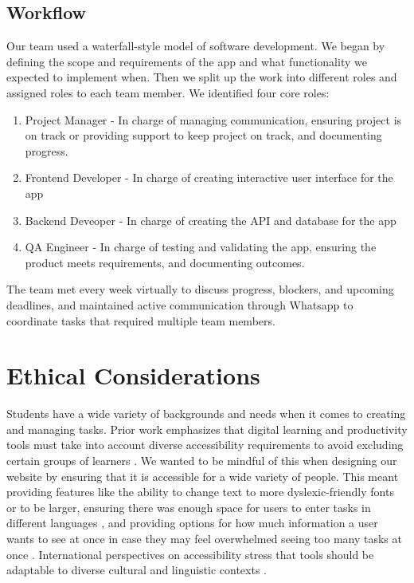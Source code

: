 \documentclass[11pt,oneside]{article}
\begin{document}
\subsection{Workflow}
Our team used a waterfall-style model of software development. We began by defining the scope and requirements of the app and what functionality we expected to implement when. Then we split up the work into different roles and assigned roles to each team member. We identified four core roles:

\begin{enumerate}
\item Project Manager - In charge of managing communication, ensuring project is on track or providing support to keep project on track, and documenting progress.
\item Frontend Developer - In charge of creating interactive user interface for the app
\item Backend Deveoper - In charge of creating the API and database for the app
\item QA Engineer - In charge of testing and validating the app, ensuring the product meets requirements, and documenting outcomes.
\end{enumerate}


The team met every week virtually to discuss progress, blockers, and upcoming deadlines, and maintained active communication through Whatsapp to coordinate tasks that required multiple team members.

\section{Ethical Considerations}
Students have a wide variety of backgrounds and needs when it comes to creating and managing tasks. Prior work emphasizes that digital learning and productivity tools must take into account diverse accessibility requirements to avoid excluding certain groups of learners \citep{seale2013learning}. We wanted to be mindful of this when designing our website by ensuring that it is accessible for a wide variety of people. This meant providing features like the ability to change text to more dyslexic-friendly fonts or to be larger, ensuring there was enough space for users to enter tasks in different languages \citep{al2016universal}, and providing options for how much information a user wants to see at once in case they may feel overwhelmed seeing too many tasks at once \citep{spina2019wcag}. International perspectives on accessibility stress that tools should be adaptable to diverse cultural and linguistic contexts \citep{world2011world}.
\end{document}

